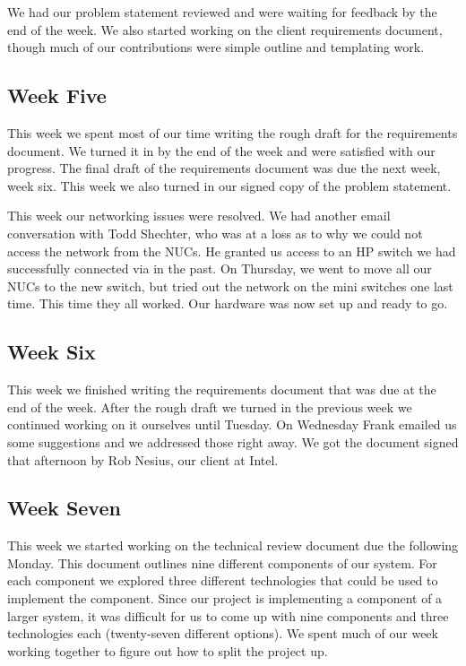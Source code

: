 \documentclass[10pt,onecolumn,journal,draftclsnofoot]{IEEEtran}
\begin{document}
We had our problem statement reviewed and were waiting for feedback by the end
of the week. We also started working on the client requirements document, though
much of our contributions were simple outline and templating work.

\subsection{Week Five}

This week we spent most of our time writing the rough draft for the requirements
document. We turned it in by the end of the week and were satisfied with our
progress. The final draft of the requirements document was due the next week,
week six. This week we also turned in our signed copy of the problem statement.

This week our networking issues were resolved. We had another email conversation
with Todd Shechter, who was at a loss as to why we could not access the network
from the NUCs. He granted us access to an HP switch we had successfully
connected via in the past. On Thursday, we went to move all our NUCs to the new
switch, but tried out the network on the mini switches one last time. This time
they all worked. Our hardware was now set up and ready to go.

\subsection{Week Six}

This week we finished writing the requirements document that was due at the end
of the week. After the rough draft we turned in the previous week we continued
working on it ourselves until Tuesday. On Wednesday Frank emailed us some
suggestions and we addressed those right away. We got the document signed that
afternoon by Rob Nesius, our client at Intel.

\subsection{Week Seven}

This week we started working on the technical review document due the following
Monday. This document outlines nine different components of our system. For each
component we explored three different technologies that could be used to
implement the component. Since our project is implementing a component of a
larger system, it was difficult for us to come up with nine components and three
technologies each (twenty-seven different options). We spent much of our week
working together to figure out how to split the project up.
\end{document}
